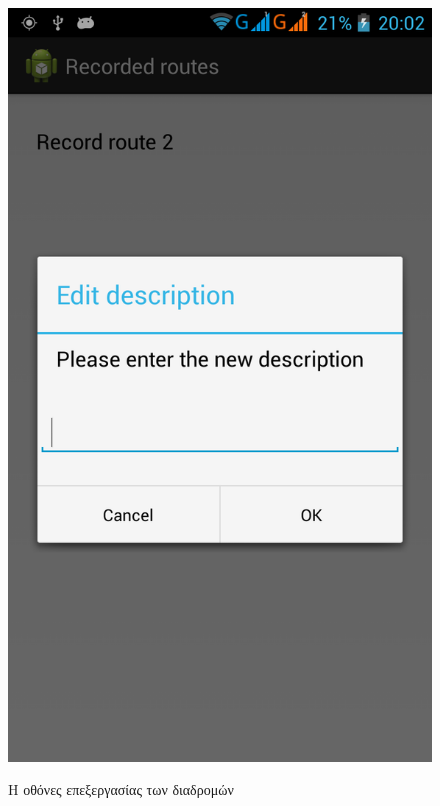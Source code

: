 \documentclass{assignment}
\begin{document}
\begin{figure}
\begin{center}
{\includegraphics{images/routes_edit.png}
}
\caption{Η οθόνες επεξεργασίας των διαδρομών}
\label{fig:routes_menu}
\end{center}
\end{figure}

\newpage
\end{document}

